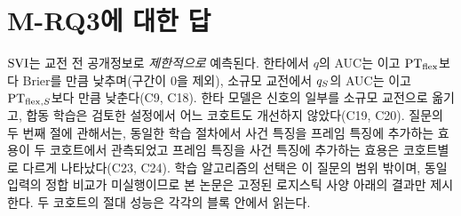 \section{M-RQ3에 대한 답}
\label{sec:pred-answer}

$\mathrm{SVI}$는 교전 전 공개정보로 \emph{제한적으로} 예측된다. 한타에서 $q$의 AUC는 \qAUC{}이고 $\mathrm{PT}_{\mathrm{flex}}$보다 Brier를 \dBrierT{}만큼 낮추며(구간이 0을 제외), 소규모 교전에서 $q_{S}$의 AUC는 \qSAUC{}이고 $\mathrm{PT}_{\mathrm{flex},S}$보다 \dBrierS{}만큼 낮춘다(C9, C18). 한타 모델은 신호의 일부를 소규모 교전으로 옮기고, 합동 학습은 검토한 설정에서 어느 코호트도 개선하지 않았다(C19, C20). 질문의 두 번째 절에 관해서는, 동일한 학습 절차에서 사건 특징을 프레임 특징에 추가하는 효용이 두 코호트에서 관측되었고 프레임 특징을 사건 특징에 추가하는 효용은 코호트별로 다르게 나타났다(C23, C24). 학습 알고리즘의 선택은 이 질문의 범위 밖이며, 동일 입력의 정합 비교가 미실행이므로 본 논문은 고정된 로지스틱 사양 아래의 결과만 제시한다. 두 코호트의 절대 성능은 각각의 블록 안에서 읽는다.

